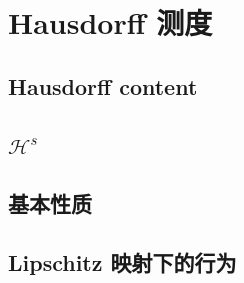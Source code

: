 \section{Hausdorff 测度}
\label{b1:sec:1501}


\subsection{Hausdorff content}
\label{b1:subsec:150101}

\subsection{\texorpdfstring{\(\mathcal H^s\)}{m}}
\label{b1:subsec:150102}

\subsection{基本性质}
\label{b1:subsec:150103}

\subsection{Lipschitz 映射下的行为}
\label{b1:subsec:150104}



